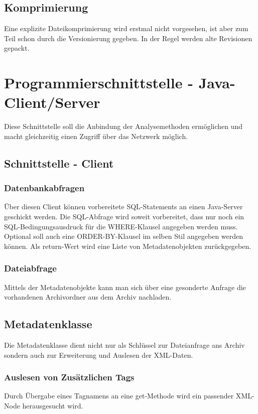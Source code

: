 \subsection{Komprimierung} \label{spec:req:archive:comp}
	Eine explizite Dateikomprimierung wird erstmal nicht vorgesehen, ist aber zum Teil schon durch die Versionierung gegeben.
	In der Regel werden alte Revisionen gepackt.

\section{Programmierschnittstelle - Java-Client/Server}\label{spec:req:jcs}
	Diese Schnittstelle soll die Anbindung der Analysemethoden ermöglichen und macht gleichzeitig einen Zugriff über das Netzwerk möglich.
\subsection{Schnittstelle - Client}\label{spec:req:jcs:client}
	\subsubsection{Datenbankabfragen} \label{spec:req:jcs:client:dbquery}
		Über diesen Client können vorbereitete SQL-Statements an einen Java-Server geschickt werden. 
		Die SQL-Abfrage wird soweit vorbereitet, dass nur noch ein SQL-Bedingungsausdruck für die WHERE-Klausel angegeben werden muss.
		Optional soll auch eine ORDER-BY-Klausel im selben Stil angegeben werden können. 
		Als return-Wert wird eine Liste von Metadatenobjekten zurückgegeben.
	\subsubsection{Dateiabfrage} \label{spec:req:jcs:client:fsquery}
		Mittels der Metadatenobjekte kann man sich über eine gesonderte Anfrage die vorhandenen Archivordner aus dem Archiv nachladen.
\subsection{Metadatenklasse} \label{spec:req:jcs:meta}
	Die Metadatenklasse dient nicht nur als Schlüssel zur Dateianfrage ans Archiv sondern auch zur Erweiterung und Auslesen der XML-Daten.
	\subsubsection{Auslesen von Zusätzlichen Tags} \label{spec:req:jcs:meta:select}
		Durch Übergabe eines Tagnamens an eine get-Methode wird ein passender XML-Node herausgesucht wird.
